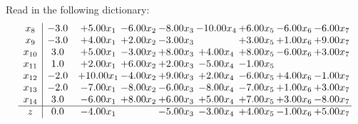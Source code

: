 \documentclass[9pt]{article}
\begin{document}
Read in the following dictionary:
\[\begin{array}{c| c c@{\hskip 2pt} c@{\hskip 2pt} c@{\hskip 2pt} c@{\hskip 2pt} c@{\hskip 2pt} c@{\hskip 2pt} c@{\hskip 2pt} }
 x_{8}   &  -3.0 & +  5.00 x_{1} & -6.00 x_{2} & -8.00 x_{3} & -10.00 x_{4} & +  6.00 x_{5} & -6.00 x_{6} & -6.00 x_{7}\\
 x_{9}   &  -3.0 & +  4.00 x_{1} & +  2.00 x_{2} & -3.00 x_{3} &   & +  3.00 x_{5} & +  1.00 x_{6} & +  9.00 x_{7}\\
 x_{10}   &  3.0 & +  5.00 x_{1} & -3.00 x_{2} & +  8.00 x_{3} & +  4.00 x_{4} & +  8.00 x_{5} & -6.00 x_{6} & +  3.00 x_{7}\\
 x_{11}   &  1.0 & +  2.00 x_{1} & +  6.00 x_{2} & +  2.00 x_{3} & -5.00 x_{4} & -1.00 x_{5} &    &   \\
 x_{12}   &  -2.0 & + 10.00 x_{1} & -4.00 x_{2} & +  9.00 x_{3} & +  2.00 x_{4} & -6.00 x_{5} & +  4.00 x_{6} & -1.00 x_{7}\\
 x_{13}   &  -2.0 & -7.00 x_{1} & -8.00 x_{2} & -6.00 x_{3} & -8.00 x_{4} & -7.00 x_{5} & +  1.00 x_{6} & +  3.00 x_{7}\\
 x_{14}   &  3.0 & -6.00 x_{1} & +  8.00 x_{2} & +  6.00 x_{3} & +  5.00 x_{4} & +  7.00 x_{5} & +  3.00 x_{6} & -8.00 x_{7}\\
\hline
z    &  0.0 & -4.00 x_{1} &   & -5.00 x_{3} & -3.00 x_{4} & +  4.00 x_{5} & -1.00 x_{6} & +  5.00 x_{7}\\
\end{array}\]
\end{document}
